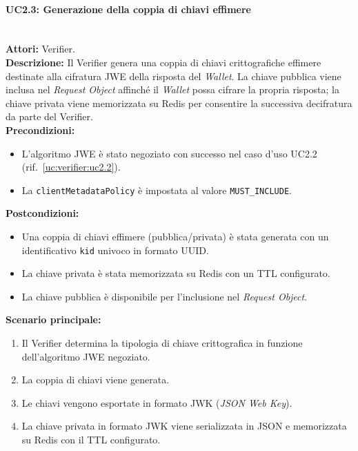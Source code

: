 \paragraph{\large\bfseries UC2.3: Generazione della coppia di chiavi effimere}
\label{uc:verifier:uc2.3}
\mbox{}\\
\noindent\textbf{Attori:} Verifier.
\\
\noindent\textbf{Descrizione:} Il Verifier genera una coppia di chiavi crittografiche effimere destinate alla cifratura JWE della risposta del \textit{Wallet}. La chiave pubblica viene inclusa nel \textit{Request Object} affinché il \textit{Wallet} possa cifrare la propria risposta; la chiave privata viene memorizzata su Redis per consentire la successiva decifratura da parte del Verifier.
\\
\noindent\textbf{Precondizioni:}
\begin{itemize}
    \item L'algoritmo JWE è stato negoziato con successo nel caso d'uso UC2.2 (rif.\ \ref{uc:verifier:uc2.2}).
    \item La \texttt{clientMetadataPolicy} è impostata al valore \texttt{MUST\_\allowbreak{}INCLUDE}.
\end{itemize}
\noindent\textbf{Postcondizioni:}
\begin{itemize}
    \item Una coppia di chiavi effimere (pubblica/privata) è stata generata con un identificativo \texttt{kid} univoco in formato UUID.
    \item La chiave privata è stata memorizzata su Redis con un TTL configurato.
    \item La chiave pubblica è disponibile per l'inclusione nel \textit{Request Object}.
\end{itemize}

\noindent\textbf{Scenario principale:}
\begin{enumerate}
    \item Il Verifier determina la tipologia di chiave crittografica in funzione dell'algoritmo JWE negoziato.
    \item La coppia di chiavi viene generata.
    \item Le chiavi vengono esportate in formato JWK (\textit{JSON Web Key}).
    \item La chiave privata in formato JWK viene serializzata in JSON e memorizzata su Redis con il TTL configurato.
\end{enumerate}

